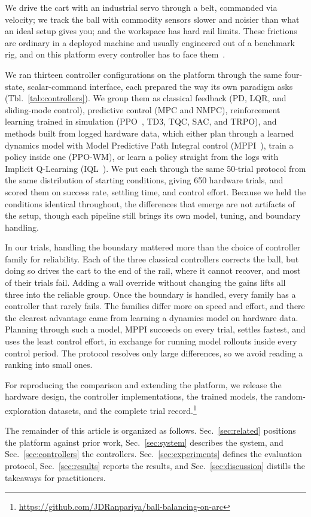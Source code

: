 We drive the cart with an industrial servo through a belt, commanded via velocity; we track the ball with commodity sensors slower and noisier than what an ideal setup gives you; and the workspace has hard rail limits.
These frictions are ordinary in a deployed machine and usually engineered out of a benchmark rig, and on this platform every controller has to face them~\cite{dulac2021challenges}.

We ran thirteen controller configurations on the platform through the same four-state, scalar-command interface, each prepared the way its own paradigm asks (Tbl.~\ref{tab:controllers}).
We group them as classical feedback (PD, LQR, and sliding-mode control), predictive control (MPC and NMPC), reinforcement learning trained in simulation (PPO~\cite{schulman2017proximal}, TD3, TQC, SAC, and TRPO), and methods built from logged hardware data, which either plan through a learned dynamics model with Model Predictive Path Integral control (MPPI~\cite{williams2017mppi}), train a policy inside one (PPO-WM), or learn a policy straight from the logs with Implicit Q-Learning (IQL~\cite{kostrikov2022iql}).
We put each through the same 50-trial protocol from the same distribution of starting conditions, giving 650 hardware trials, and scored them on success rate, settling time, and control effort.
Because we held the conditions identical throughout, the differences that emerge are not artifacts of the setup, though each pipeline still brings its own model, tuning, and boundary handling.

In our trials, handling the boundary mattered more than the choice of controller family for reliability.
Each of the three classical controllers corrects the ball, but doing so drives the cart to the end of the rail, where it cannot recover, and most of their trials fail.
Adding a wall override without changing the gains lifts all three into the reliable group.
Once the boundary is handled, every family has a controller that rarely fails.
The families differ more on speed and effort, and there the clearest advantage came from learning a dynamics model on hardware data.
Planning through such a model, MPPI succeeds on every trial, settles fastest, and uses the least control effort, in exchange for running model rollouts inside every control period.
The protocol resolves only large differences, so we avoid reading a ranking into small ones.

For reproducing the comparison and extending the platform, we release the hardware design, the controller implementations, the trained models, the random-exploration datasets, and the complete trial record.\footnote{\url{https://github.com/JDRanpariya/ball-balancing-on-arc}}

The remainder of this article is organized as follows.
Sec.~\ref{sec:related} positions the platform against prior work, Sec.~\ref{sec:system} describes the system, and Sec.~\ref{sec:controllers} the controllers.
Sec.~\ref{sec:experiments} defines the evaluation protocol, Sec.~\ref{sec:results} reports the results, and Sec.~\ref{sec:discussion} distills the takeaways for practitioners.
